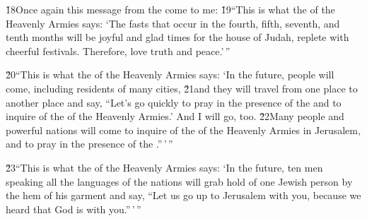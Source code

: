 \v{18}Once again this message from the  come to me: \v{19}``This is what the  of the Heavenly Armies says: `The fasts that occur in the fourth, fifth, seventh, and tenth months will be joyful and glad times for the house of Judah, replete with cheerful festivals. Therefore, love truth and peace.'\,''

\v{20}``This is what the  of the Heavenly Armies says: `In the future, people will come, including residents of many cities, \v{21}and they will travel from one place to another place and say, ``Let's go quickly to pray in the presence of the  and to inquire of the  of the Heavenly Armies.' And I will go, too. \v{22}Many people and powerful nations will come to inquire of the  of the Heavenly Armies in Jerusalem, and to pray in the presence of the .''\,'\,''

\v{23}``This is what the  of the Heavenly Armies says: `In the future, ten men speaking all the languages of the nations will grab hold of one Jewish person by the hem of his garment and say, ``Let us go up to Jerusalem with you, because we heard that God is with you.''\,'\,''

